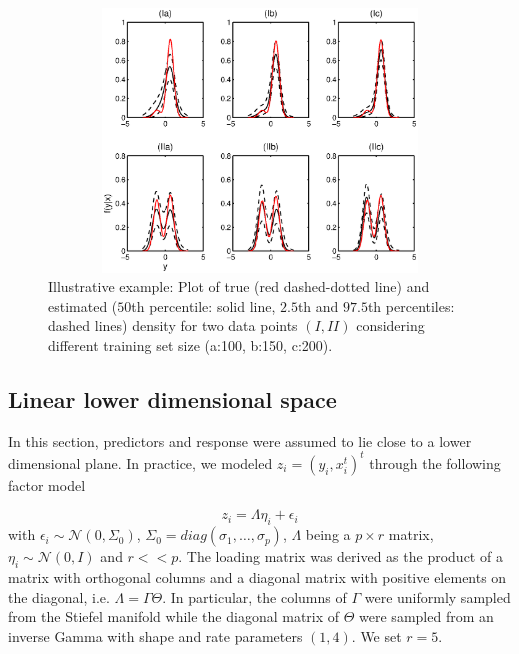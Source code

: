 \documentclass{article} %
\providecommand{\mc}[1]{\mathcal{#1}}
\begin{document}
\begin{figure}[h!]
\centering
\includegraphics[width=120mm,height=70mm]{ch3_density.eps}
\caption{Illustrative example: Plot of true (red dashed-dotted line) and estimated ($50$th percentile: solid line, $2.5$th and $97.5$th percentiles: dashed lines) density for two data points $(I, II)$ considering different training set size (a:100, b:150, c:200). } \label{plotDensity}
\end{figure}



\subsection{Linear lower dimensional space} \label{section:linear}

In this section, predictors and response were assumed to lie close to a lower dimensional plane. In practice, we modeled $z_i=(y_i,x_i^t)^t$ through the following factor model

\begin{equation} z_i=\Lambda \eta_i + \epsilon_i \end{equation} 
with $\epsilon_i \sim \mc{N}(0,\Sigma_0)$, $\Sigma_0=diag(\sigma_1, \ldots, \sigma_p)$, $\Lambda$ being a $p \times r$ matrix, $\eta_i \sim \mc{N}(0,I)$ and $r<<p$. The loading matrix was derived as the product of a matrix with orthogonal columns and a diagonal matrix with positive elements on the diagonal, i.e. $\Lambda=\Gamma \Theta$. In particular, the columns of $\Gamma$ were uniformly sampled from the Stiefel manifold while the diagonal matrix of $\Theta$ were sampled from an inverse Gamma with shape and rate parameters $(1,4)$. We set $r=5$.
\end{document}
